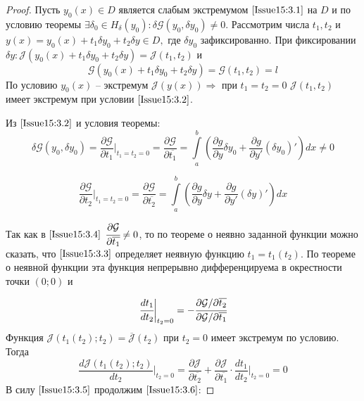 \begin{proof}
Пусть $y_0(x)\in D$ является слабым экстремумом $\eqref{Issue15:3.1}$ на $D$ и по условию теоремы $\exists \delta_0\in H_\delta(y_0): \delta\mathcal{G}(y_0,\delta y_0)\neq 0$. Рассмотрим числа $t_1, t_2$ и $y(x)=y_0(x)+t_1\delta y_0 + t_2 \delta y \in D,$ где $\delta y_0$ зафиксированно. При фиксировании $\delta y: \mathcal{J}(y_0(x)+t_1\delta y_0+t_2 \delta y)=\mathcal{J}(t_1,t_2)$ и \begin{equation}
    \label{Issue15:3.3}
    \mathcal{G}(y_0(x)+t_1\delta y_0+t_2 \delta y)=\mathcal{G}(t_1,t_2)=l
\end{equation}
По условию $y_0(x)$ -- экстремум $\mathcal{J}(y(x))\Rightarrow$ при $t_1=t_2=0$ $\mathcal{J}(t_1,t_2)$ имеет экстремум при условии $\eqref{Issue15:3.2}$.

Из $\eqref{Issue15:3.2}$ и условия теоремы: 
$$\delta \mathcal{G}(y_0,\delta y_0)=\frac{\partial \mathcal{G}}{\partial t_1} \bigg|_{t_1=t_2=0} = \frac{\partial \mathcal{G}}{\partial\overline{t_1}} = \int\limits_a^b \left( \frac{\partial g}{\partial y}\delta y_0+\frac{\partial g}{\partial y'}(\delta y_0)' \right) dx \neq 0$$

\begin{equation}
\frac{\partial \mathcal{G}}{\partial t_2} \bigg|_{t_1 = t_2 = 0} = \frac{\partial \mathcal{G}}{\partial\overline{t_2}} = \int\limits_a^b \left( \frac{\partial g}{\partial y}\delta y+\frac{\partial g}{\partial y'}(\delta y)' \right) dx
\label{Issue15:3.4}
\end{equation}

Так как в $\eqref{Issue15:3.4}$ $\cfrac{\partial \mathcal{G}}{\partial \overline{t_1}}\neq 0$, то по теореме о неявно заданной функции можно сказать, что $\eqref{Issue15:3.3}$ определяет неявную функцию $t_1=t_1(t_2)$. По теореме о неявной функции эта функция непрерывно дифференцируема в окрестности точки $(0;0)$ и 

\begin{equation}
    \cfrac{dt_1}{dt_2}\bigg|_{t_2 = 0} = -\cfrac{\partial \mathcal{G}/\partial \overline{t_2}}{\partial \mathcal{G}/\partial \overline{t_1}}
    \label{Issue15:3.5}
\end{equation}
Функция $\mathcal{J}(t_1(t_2);t_2)=\overline{\mathcal{J}}(t_2)$ при $t_2=0$ имеет экстремум по условию. Тогда \begin{equation}
    \frac{d\mathcal{J}(t_1(t_2);t_2)}{dt_2} \bigg|_{t_2=0}=\frac{\partial \mathcal{J}}{\partial \overline{t_2}}+ \frac{\partial \mathcal{J}}{\partial \overline{t_1}}\cdot \frac{d t_1}{d t_2}\bigg|_{t_2=0}=0
    \label{Issue15:3.6}
    \end{equation}
В силу $\eqref{Issue15:3.5}$ продолжим $\eqref{Issue15:3.6}$: 


\end{proof}
